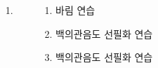 \documentclass[25pt, a1paper ]{tikzposter}
\begin{document}
\begin{columns}
{		}		







			{				
			\setlength{\leftmargini}{7em}			
			\setlength{\labelsep}{1em} %

			\begin{LARGE}
			\begin{itemize}
			\item [1.] 
			\end{itemize}
			\end{LARGE}
		}


		{
			\setlength{\leftmargini}{7em}			
			\setlength{\labelsep}{1em} %
			\begin{LARGE}
			\begin{itemize}
			\item [1.] 바림 연습
			\item [2.] 백의관음도 선필화 연습
			\item [3.] 백의관음도 선필화 연습
			\end{itemize}
			\end{LARGE}
		}		





	\end{columns}
\end{document}
